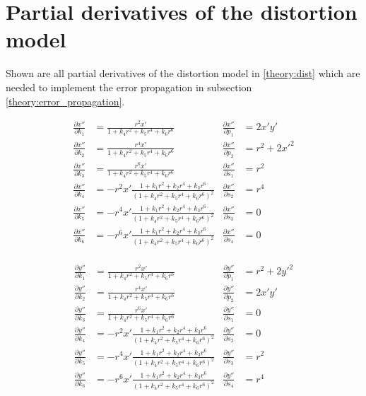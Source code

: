 \chapter{Partial derivatives of the distortion model}
Shown are all partial derivatives of the distortion model in \ref{theory:dist} which are needed to implement the error propagation in subsection \ref{theory:error_propagation}.

\begin{align*}
\frac{\partial x''}{\partial k_1}&=\frac{r^2 x'}{1+k_4 r^2+k_5 r^4+k_6 r^6}&\frac{\partial x''}{\partial p_1}&=2x'y'\\
\frac{\partial x''}{\partial k_2}&=\frac{r^4 x'}{1+k_4 r^2+k_5 r^4+k_6 r^6}&\frac{\partial x''}{\partial p_2}&=r^2+2x'^2\\
\frac{\partial x''}{\partial k_3}&=\frac{r^6 x'}{1+k_4 r^2+k_5 r^4+k_6 r^6}&\frac{\partial x''}{\partial s_1}&=r^2\\
\frac{\partial x''}{\partial k_4}&=-r^2x'\frac{1+k_1 r^2+k_2 r^4+k_3 r^6}{(1+k_4 r^2+k_5 r^4+k_6 r^6)^2}&\frac{\partial x''}{\partial s_2}&=r^4\\
\frac{\partial x''}{\partial k_5}&=-r^4x'\frac{1+k_1 r^2+k_2 r^4+k_3 r^6}{(1+k_4 r^2+k_5 r^4+k_6 r^6)^2}&\frac{\partial x''}{\partial s_3}&=0\\
\frac{\partial x''}{\partial k_6}&=-r^6x'\frac{1+k_1 r^2+k_2 r^4+k_3 r^6}{(1+k_4 r^2+k_5 r^4+k_6 r^6)^2}&\frac{\partial x''}{\partial s_4}&=0\\
\end{align*}

\begin{align*}
\frac{\partial y''}{\partial k_1}&=\frac{r^2 x'}{1+k_4 r^2+k_5 r^4+k_6 r^6}&\frac{\partial y''}{\partial p_1}&=r^2+2y'^2\\
\frac{\partial y''}{\partial k_2}&=\frac{r^4 x'}{1+k_4 r^2+k_5 r^4+k_6 r^6}&\frac{\partial y''}{\partial p_2}&=2x'y'\\
\frac{\partial y''}{\partial k_3}&=\frac{r^6 x'}{1+k_4 r^2+k_5 r^4+k_6 r^6}&\frac{\partial y''}{\partial s_1}&=0\\
\frac{\partial y''}{\partial k_4}&=-r^2x'\frac{1+k_1 r^2+k_2 r^4+k_3 r^6}{(1+k_4 r^2+k_5 r^4+k_6 r^6)^2}&\frac{\partial y''}{\partial s_2}&=0\\
\frac{\partial y''}{\partial k_5}&=-r^4x'\frac{1+k_1 r^2+k_2 r^4+k_3 r^6}{(1+k_4 r^2+k_5 r^4+k_6 r^6)^2}&\frac{\partial y''}{\partial s_3}&=r^2\\
\frac{\partial y''}{\partial k_6}&=-r^6x'\frac{1+k_1 r^2+k_2 r^4+k_3 r^6}{(1+k_4 r^2+k_5 r^4+k_6 r^6)^2}&\frac{\partial y''}{\partial s_4}&=r^4\\
\end{align*}


